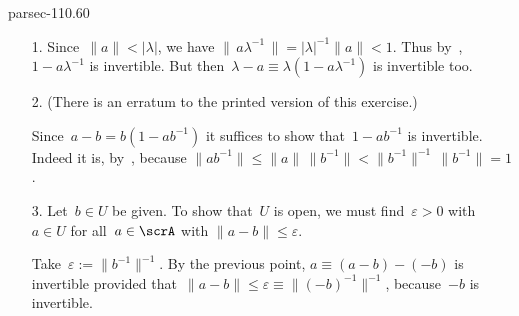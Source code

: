 \documentclass[b5page]{book}
\begin{document}
\begin{solution}{parsec-110.60}
\begin{enumerate}
\item[1.]
Since~$\|a\|<\left|\lambda\right|$,
we have $\| \, a\lambda^{-1}\,\|
= \left|\lambda\right|^{-1}\|a\| <1$.
Thus by~,
$1-a\lambda^{-1}$ is invertible.
But then~$\lambda-a \equiv \lambda (1-a\lambda^{-1})$
is invertible too.
\item[2.]
(There is an erratum to the printed
        version of this exercise.)

Since~$a-b = b(1-ab^{-1})$
it suffices to show
        that~$1-ab^{-1}$ is invertible.
    Indeed it is, by~,
        because $\|ab^{-1}\|\leq \|a\|\,\|b^{-1}\| < 
        \|b^{-1}\|^{-1}\,\|b^{-1}\| = 1$.

\item[3.]
Let~$b\in U$ be given.
To show that~$U$ is open,
we must find~$\varepsilon>0$
with $a\in U$ for all~$a\in\scrA$ with $\|a-b\|\leq \varepsilon$.

Take~$\varepsilon:= \|b^{-1}\|^{-1}$. 
By the previous point,
        $a\equiv (a-b)-(-b)$
        is invertible
        provided that~$\|a-b\|\leq \varepsilon \equiv \|(-b)^{-1}\|^{-1}$,
        because~$-b$ is invertible.
\end{enumerate}
\end{solution}
\end{document}
